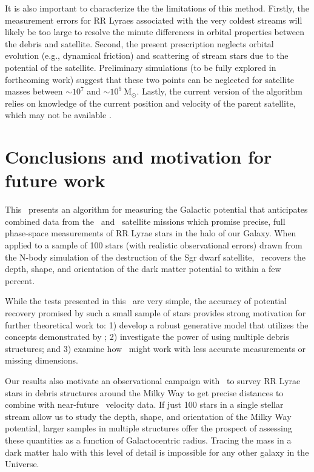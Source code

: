 It is also important to characterize the the limitations of this method.
Firstly, the measurement errors for RR Lyraes associated with the very coldest
streams \citep[e.g., the globular clusters Pal5 and GD1;][]{odenkirchen02,
koposov10} will likely be too large to resolve the minute differences in orbital
properties between the debris and satellite. Second, the present prescription
neglects orbital evolution (e.g., dynamical friction) and scattering of stream
stars due to the potential of the satellite. Preliminary simulations (to be
fully explored in forthcoming work) suggest that these two points can be
neglected for satellite masses between $\sim$$10^7$ and
$\sim$$10^9~\mathrm{M}_{\odot}$. Lastly, the current version of the algorithm
relies on knowledge of the current position and velocity of the parent
satellite, which may not be available \citep[e.g., the Orphan
Stream;][]{belokurov07}.

\section{Conclusions and motivation for future work}
\label{sec:ch2-conclusion}

This \article\ presents an algorithm for measuring the Galactic potential that
anticipates combined data from the \spitzer\ and \gaia\ satellite
missions which promise precise, full phase-space measurements of RR Lyrae stars
in the halo of our Galaxy. When applied to a sample of 100 stars (with realistic
observational errors) drawn from the \cite{law10} N-body simulation of the
destruction of the Sgr dwarf satellite, \rewinder\ recovers the depth,
shape, and orientation of the dark matter potential to within a few percent.

While the tests presented in this \article\ are very simple, the accuracy of
potential recovery promised by such a small sample of stars provides strong
motivation for further theoretical work to: 1) develop a robust generative model
that utilizes the concepts demonstrated by \rewinder; 2) investigate the
power of using multiple debris structures; and 3) examine how \rewinder\
might work with less accurate measurements or missing dimensions.

Our results also motivate an observational campaign with \spitzer\ to survey
RR Lyrae stars in debris structures around the Milky Way to get precise
distances to combine with near-future \gaia\ velocity data. If just 100
stars in a single stellar stream allow us to study the depth, shape, and
orientation of the Milky Way potential, larger samples in multiple structures
\citep[e.g., the Orphan Stream;][]{sesar13b} offer the prospect of assessing
these quantities as a function of Galactocentric radius. Tracing the mass in a
dark matter halo with this level of detail is impossible for any other galaxy in
the Universe.

